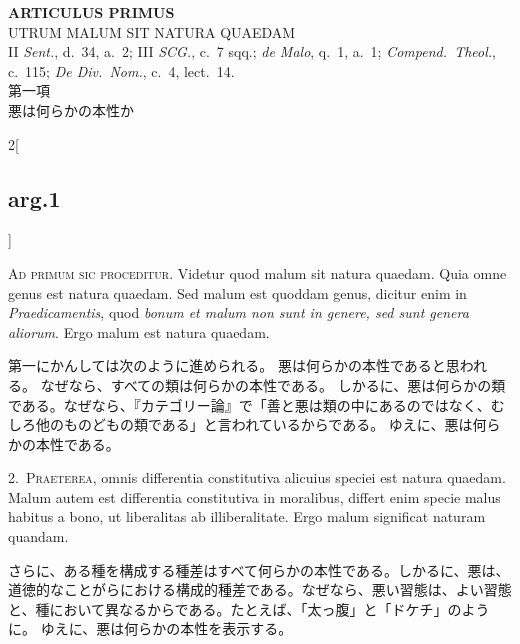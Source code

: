 \documentclass[paper=a4paper,fontsize=10pt,jafontsize=9pt,titlepage]{jlreq}
\begin{document}
\begin{center}
 {\Large {\bfseries ARTICULUS PRIMUS}}\\
 {\large UTRUM MALUM SIT NATURA QUAEDAM}\\
 {\footnotesize II {\itshape Sent.}, d.~34, a.~2; III {\itshape SCG.}, c.~7 sqq.; {\itshape de Malo}, q.~1, a.~1; {\itshape Compend.~Theol.}, c.~115; {\itshape De Div.~Nom.}, c.~4, lect.~14.}\\
 {\Large 第一項\\悪は何らかの本性か}
\end{center}

\begin{paracol}{2}[\subsection{arg.1}]

{\huge A}{\scshape d primum sic proceditur}. Videtur quod malum sit
natura quaedam. Quia omne genus est natura quaedam. Sed malum est
quoddam genus, dicitur enim in {\itshape Praedicamentis}, quod {\itshape
bonum et malum non sunt in genere, sed sunt genera aliorum}. Ergo malum
est natura quaedam.

\switchcolumn

第一にかんしては次のように進められる。
悪は何らかの本性であると思われる。
なぜなら、すべての類は何らかの本性である。
しかるに、悪は何らかの類である。なぜなら、『カテゴリー論』で「善と悪は類の中にあるのではなく、むしろ他のものどもの類である」と言われているからである。
ゆえに、悪は何らかの本性である。


2.~{\scshape Praeterea}, omnis differentia constitutiva alicuius speciei
est natura quaedam. Malum autem est differentia constitutiva in
moralibus, differt enim specie malus habitus a bono, ut liberalitas ab
illiberalitate. Ergo malum significat naturam quandam.

\switchcolumn

さらに、ある種を構成する種差はすべて何らかの本性である。しかるに、悪は、
道徳的なことがらにおける構成的種差である。なぜなら、悪い習態は、よい習態
と、種において異なるからである。たとえば、「太っ腹」と「ドケチ」のように。
ゆえに、悪は何らかの本性を表示する。



\end{paracol}
\end{document}
